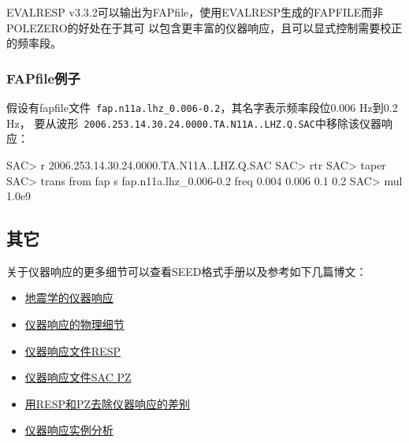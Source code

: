 EVALRESP v3.3.2可以输出为FAPfile，使用EVALRESP生成的FAPFILE而非POLEZERO的好处在于其可
以包含更丰富的仪器响应，且可以显式控制需要校正的频率段。

\subsubsection{FAPfile例子}
假设有fapfile文件~\verb+fap.n11a.lhz_0.006-0.2+，其名字表示频率段位0.006 Hz到0.2 Hz，
要从波形~\verb+2006.253.14.30.24.0000.TA.N11A..LHZ.Q.SAC+中移除该仪器响应：
\begin{SACCode}
SAC> r 2006.253.14.30.24.0000.TA.N11A..LHZ.Q.SAC
SAC> rtr
SAC> taper
SAC> trans from fap s fap.n11a.lhz_0.006-0.2 freq 0.004 0.006 0.1 0.2
SAC> mul 1.0e9
\end{SACCode}

\subsection{其它}

关于仪器响应的更多细节可以查看SEED格式手册以及参考如下几篇博文：
\begin{itemize}
\item \href{http://seisman.info/instrumental-response-in-seismology.html}{地震学的仪器响应}
\item \href{http://seisman.info/physical-details-of-instrumental-response.html}{仪器响应的物理细节}
\item \href{http://seisman.info/simple-analysis-of-resp.html}{仪器响应文件RESP}
\item \href{http://seisman.info/simple-analysis-of-sac-pz.html}{仪器响应文件SAC PZ}
\item \href{http://seisman.info/difference-between-resp-and-pz-while-deconvolution.html}{用RESP和PZ去除仪器响应的差别}
\item \href{http://seisman.info/deep-analysis-of-response.html}{仪器响应实例分析}
\end{itemize}
